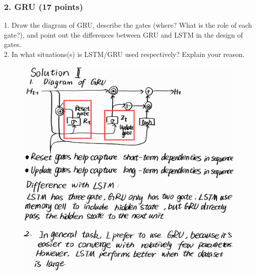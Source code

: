 \documentclass[12pt]{article}%
\begin{document}
\newpage


\subsubsection*{2. GRU (17 points)}

1. Draw the diagram of GRU, describe the gates (where? What is the role of each gate?), and point out the differences between GRU and LSTM in the design of gates.\\
2. In what situations(s) is LSTM/GRU used respectively? Explain your reason.

\begin{figure}[!h]
	\centering
	\includegraphics[width=5in]{2.png}
\end{figure}
\newpage
\end{document}
